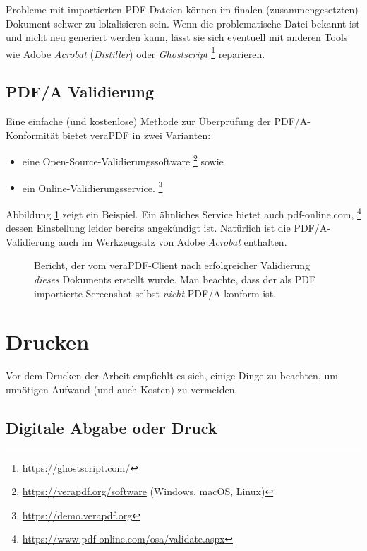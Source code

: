 Probleme mit importierten PDF-Dateien können im finalen (zusammengesetzten) Dokument
schwer zu lokalisieren sein. Wenn die problematische Datei bekannt ist und nicht 
neu generiert werden kann, lässt sie sich eventuell mit anderen Tools wie Adobe \emph{Acrobat} 
(\emph{Distiller}) oder \emph{Ghostscript}%
\footnote{\url{https://ghostscript.com/}}
reparieren.


\subsection{PDF/A Validierung}
\label{sec:PDFA-validation}

Eine einfache (und kostenlose) Methode zur Überprüfung der PDF/A-Konformität bietet
\textsf{veraPDF} in zwei Varianten:
%
\begin{itemize}
\item eine Open-Source-Validierungssoftware%
  \footnote{\url{https://verapdf.org/software} (Windows, macOS, Linux)} sowie
\item ein Online-Validierungsservice.%
  \footnote{\url{https://demo.verapdf.org}}
\end{itemize}
%
Abbildung \ref{fig:verapdf-report} zeigt ein Beispiel. Ein ähnliches Service bietet
auch \textsf{pdf-online.com},%
\footnote{\url{https://www.pdf-online.com/osa/validate.aspx}}
dessen Einstellung leider bereits angekündigt ist.
Natürlich ist die PDF/A-Validierung auch im Werkzeugsatz von Adobe \emph{Acrobat} enthalten.

\begin{figure}[htbp]
    \centering
    \caption{Bericht, der vom \textsf{veraPDF}-Client nach erfolgreicher Validierung 
    \emph{dieses} Dokuments erstellt wurde. Man beachte, dass der als PDF importierte Screenshot 
    selbst \emph{nicht} PDF/A-konform ist.}
    \label{fig:verapdf-report}
\end{figure}


\section{Drucken}

Vor dem Drucken der Arbeit empfiehlt es sich, einige Dinge zu beachten, um
unnötigen Aufwand (und auch Kosten) zu vermeiden.

\subsection{Digitale Abgabe oder Druck}

